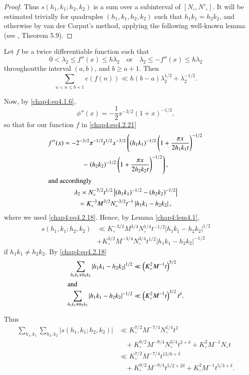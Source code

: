 \begin{proof}
Thus $s(h_1,k_1;h_2,k_2)$ is a sum over a subinterval of $[N_\circ,N'_\circ]$. It will be estimated trivially for quadruples $(h_1,k_1,h_2,k_2)$ such that $h_1k_1=h_2k_2$, and otherwise by van der Corput's method, applying the following well-known lemma (see \cite{key27}, Theorem 5.9).
\end{proof}

\begin{lem}\label{chap4:lem4.1}
Let $f$ be a twice differentiable function such that 
$$
0<\lambda_2\leq f''(x)\leq h\lambda_2\quad\text{or}\quad \lambda_2\leq -f''(x)\leq h\lambda_2
$$
throughout\pageoriginale the interval $(a,b)$, and $b\geq a+1$. Then
$$
\sum\limits_{a<n\leq b+1}e(f(n))\ll h(b-a)\lambda_2^{1/2}+\lambda_2^{-1/2}.
$$
\end{lem}

Now, by \eqref{chap4:eq4.1.6},
$$
\phi''(x)=-\frac{1}{2}x^{-3/2}(1+x)^{-1/2},
$$
so that for our function $f$ in \eqref{chap4:eq4.2.21}
\begin{gather*}
f''(x)=-2^{-3/2}\pi^{-1/2}t^{1/2}x^{-3/2}\left(\left(h_1k_1\right)^{-1/2}\left( 1+\frac{\pi x}{2h_1k_1t}\right)^{-1/2}\right.\\
-\left.\left(h_2k_2\right)^{-1/2}\left(1+\frac{\pi x}{2h_2k_2t}\right)^{-1/2}\right),\\
\intertext{and accordingly}
\lambda_2\asymp N_\circ^{-3/2}t^{1/2}\left|\left(h_1k_1\right)^{-1/2}-\left( h_2k_2\right)^{-1/2}\right|\\
\asymp K_\circ^{-3}M^{3/2}N_\circ^{-3/2}t^{-1}\left|h_1k_1-h_2k_2\right|,
\end{gather*}
where we used \eqref{chap4:eq4.2.18}. Hence, by Lemma \ref{chap4:lem4.1},
\begin{align*}
s\left(h_1,k_1;h_2,k_2\right) &\ll K_\circ^{-3/2}M^{3/4}N_\circ^{1/4}t^{-1/2} \left|h_1k_1-h_2k_2\right|^{1/2}\\
&+ K_\circ^{3/2}M^{-3/4}N_\circ^{3/4}t^{1/2}\left|h_1k_1-h_2k_2\right|^{-1/2}
\end{align*}
if $h_1k_1\neq h_2k_2$. By \eqref{chap4:eq4.2.18}
\begin{align*}
\sum\limits_{h_1k_1\neq h_2k_2}\left|h_1k_1-h_2k_2\right|^{1/2} &\ll \left( K_\circ^2M^{-1}t\right)^{5/2}\\
\intertext{and}
\sum\limits_{h_1k_1\neq h_2k_2}\left|h_1k_1-h_2k_2\right|^{-1/2} &\ll \left(K_\circ^2M^{-1}t\right)^{3/2}t^\delta.
\end{align*}

Thus
\begin{align*}
\sum\limits_{h_1,k_1}\sum\limits_{h_2,k_2}\left|s\left(h_1,k_1;h_2,k_2\right) \right| &\ll K_\circ^{7/2}M^{-7/4}N_\circ^{1/4}t^2\\
&\quad +K_\circ^{9/2}M^{-9/4}N_\circ^{3/4}t^{2+\delta}+K_\circ^2M^{-1}N_\circ t\\
&\ll K_\circ^{7/2}M^{-7/4}t^{13/6+\delta}\\
&\quad +K_\circ^{9/2}M^{-9/4}t^{5/2+2\delta}+K_\circ^2M^{-1}t^{5/3+\delta}.
\end{align*}

